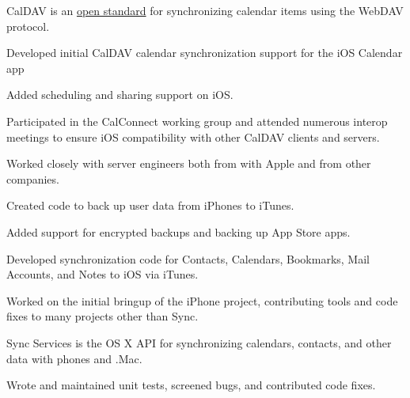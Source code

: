 \begin{cventries}
{\begin{cvsubentries}
{        		}
       		{CalDAV is an \href{https://tools.ietf.org/html/rfc4791}{open standard} for synchronizing calendar items using the WebDAV protocol.
		\vspace{2.0mm}
		\begin{cvitems}
         		\item {Developed initial CalDAV calendar synchronization support for the iOS Calendar app}
			\item {Added scheduling and sharing support on iOS.} 
         		\item {Participated in the CalConnect working group and attended numerous interop meetings to ensure iOS compatibility with other CalDAV clients and servers.}
			\item {Worked closely with server engineers both from with Apple and from other companies.}
         	 \end{cvitems}
        		}
       		{
		\vspace{-2.0mm}
		\begin{cvitems}
         		\item {Created code to back up user data from iPhones to iTunes.}
			\item {Added support for encrypted backups and backing up App Store apps.}
         	 \end{cvitems}
        		}
       		{
		\vspace{-2.0mm}
		\begin{cvitems}
         		\item {Developed synchronization code for Contacts, Calendars, Bookmarks, Mail Accounts, and Notes to iOS via iTunes.}
			\item {Worked on the initial bringup of the iPhone project, contributing tools and code fixes to many projects other than Sync.}
         	 \end{cvitems}
        		}
       		{Sync Services is the OS X API for synchronizing calendars, contacts, and other data with phones and .Mac.
		\vspace{2.0mm}
		\begin{cvitems}
         		\item {Wrote and maintained unit tests, screened bugs, and contributed code fixes.}
         	 \end{cvitems}
        		}
      	\end{cvsubentries}
    }
\end{cventries}